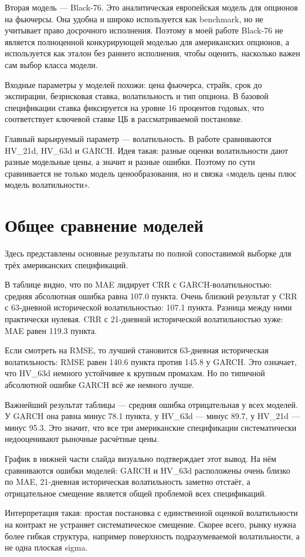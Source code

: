 \documentclass[11pt,a4paper]{article}
\newcommand{\slidetitle}[1]{\section{#1}}
\begin{document}
Вторая модель --- Black-76. Это аналитическая европейская модель для опционов на фьючерсы. Она удобна и широко используется как benchmark, но не учитывает право досрочного исполнения. Поэтому в моей работе Black-76 не является полноценной конкурирующей моделью для американских опционов, а используется как эталон без раннего исполнения, чтобы оценить, насколько важен сам выбор класса модели.

Входные параметры у моделей похожи: цена фьючерса, страйк, срок до экспирации, безрисковая ставка, волатильность и тип опциона. В базовой спецификации ставка фиксируется на уровне 16 процентов годовых, что соответствует ключевой ставке ЦБ в рассматриваемой постановке.

Главный варьируемый параметр --- волатильность. В работе сравниваются HV\_21d, HV\_63d и GARCH. Идея такая: разные оценки волатильности дают разные модельные цены, а значит и разные ошибки. Поэтому по сути сравнивается не только модель ценообразования, но и связка «модель цены плюс модель волатильности».

\slidetitle{Общее сравнение моделей}

Здесь представлены основные результаты по полной сопоставимой выборке для трёх американских спецификаций.

В таблице видно, что по MAE лидирует CRR с GARCH-волатильностью: средняя абсолютная ошибка равна 107.0 пункта. Очень близкий результат у CRR с 63-дневной исторической волатильностью: 107.1 пункта. Разница между ними практически нулевая. CRR с 21-дневной исторической волатильностью хуже: MAE равен 119.3 пункта.

Если смотреть на RMSE, то лучшей становится 63-дневная историческая волатильность: RMSE равен 140.6 пункта против 145.8 у GARCH. Это означает, что HV\_63d немного устойчивее к крупным промахам. Но по типичной абсолютной ошибке GARCH всё же немного лучше.

Важнейший результат таблицы --- средняя ошибка отрицательная у всех моделей. У GARCH она равна минус 78.1 пункта, у HV\_63d --- минус 89.7, у HV\_21d --- минус 95.3. Это значит, что все три американские спецификации систематически недооценивают рыночные расчётные цены.

График в нижней части слайда визуально подтверждает этот вывод. На нём сравниваются ошибки моделей: GARCH и HV\_63d расположены очень близко по MAE, 21-дневная историческая волатильность заметно отстаёт, а отрицательное смещение является общей проблемой всех спецификаций.

Интерпретация такая: простая постановка с единственной оценкой волатильности на контракт не устраняет систематическое смещение. Скорее всего, рынку нужна более гибкая структура, например поверхность подразумеваемой волатильности, а не одна плоская sigma.
\end{document}
